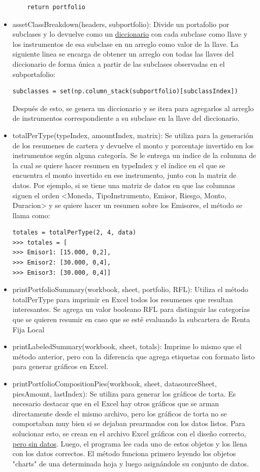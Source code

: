 \documentclass{article}
\begin{document}
\begin{itemize}
\begin{lstlisting}
    return portfolio
\end{lstlisting}

\item assetClassBreakdown(headers, subportfolio): Divide un portafolio por subclases y lo devuelve como un \href{https://en.wikipedia.org/wiki/Associative_array}{diccionario} con cada subclase como llave y los instrumentos de esa subclase en un arreglo como valor de la llave. 
La siguiente linea se encarga de obtener un arreglo con todas las llaves del diccionario de forma única a partir de las subclases observadas en el subportafolio:
\begin{lstlisting}
subclasses = set(np.column_stack(subportfolio)[subclassIndex])
\end{lstlisting}
Después de esto, se genera un diccionario y se itera para agregarlos al arreglo de instrumentos correspondiente a su subclase en la llave del diccionario.


\item totalPerType(typeIndex, amountIndex, matrix): Se utiliza para la generación de los resumenes de cartera y devuelve el monto y porcentaje invertido en los instrumentos según alguna categoría. Se le entrega un indice de la columna de la cual se quiere hacer resumen en typeIndex y el índice en el que se encuentra el monto invertido en ese instrumento, junto con la matriz de datos. Por ejemplo, si se tiene una matriz de datos en que las columnas siguen el orden <Moneda, TipoInstrumento, Emisor, Riesgo, Monto, Duracion> y se quiere hacer un resumen sobre los Emisores, el método se llama como:
\begin{lstlisting}
totales = totalPerType(2, 4, data)
>>> totales = [
>>> Emisor1: [15.000, 0,2], 
>>> Emisor2: [30.000, 0,4], 
>>> Emisor3: [30.000, 0,4]]
\end{lstlisting}

\item printPortfolioSummary(workbook, sheet, portfolio, RFL): Utiliza el método totalPerType para imprimir en Excel todos los resumenes que resultan interesantes. Se agrega un valor booleano RFL para distinguir las categorías que se quieren resumir en caso que se esté evaluando la subcartera de Renta Fija Local

\item printLabeledSummary(workbook, sheet, totals): Imprime lo mismo que el método anterior, pero con la diferencia que agrega etiquetas con formato listo para generar gráficos en Excel.

\item printPortfolioCompositionPies(workbook, sheet, datasourceSheet, piesAmount, lastIndex): Se utiliza para generar los gráficos de torta. Es necesario destacar que en el Excel hay otros gráficos que se arman directamente desde el mismo archivo, pero los gráficos de torta no se comportaban muy bien si se dejaban prearmados con los datos listos. Para solucionar esto, se crean en el archivo Excel gráficos con el diseño correcto, \underline{pero sin datos}. Luego, el programa lee cada uno de estos objetos y los llena con los datos correctos.
El método funciona primero leyendo los objetos "charts" de una determinada hoja y luego asignándole su conjunto de datos.


\end{itemize}
\end{document}
